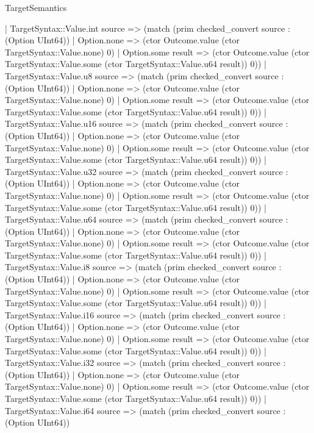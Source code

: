 \begin{lexlean}{TargetSemantics}
\begin{semanticmodule}
{            | TargetSyntax::Value.int source => (match (prim checked_convert source : (Option UInt64))
              | Option.none => (ctor Outcome.value (ctor TargetSyntax::Value.none) 0)
              | Option.some result => (ctor Outcome.value (ctor TargetSyntax::Value.some (ctor TargetSyntax::Value.u64 result)) 0))
            | TargetSyntax::Value.u8 source => (match (prim checked_convert source : (Option UInt64))
              | Option.none => (ctor Outcome.value (ctor TargetSyntax::Value.none) 0)
              | Option.some result => (ctor Outcome.value (ctor TargetSyntax::Value.some (ctor TargetSyntax::Value.u64 result)) 0))
            | TargetSyntax::Value.u16 source => (match (prim checked_convert source : (Option UInt64))
              | Option.none => (ctor Outcome.value (ctor TargetSyntax::Value.none) 0)
              | Option.some result => (ctor Outcome.value (ctor TargetSyntax::Value.some (ctor TargetSyntax::Value.u64 result)) 0))
            | TargetSyntax::Value.u32 source => (match (prim checked_convert source : (Option UInt64))
              | Option.none => (ctor Outcome.value (ctor TargetSyntax::Value.none) 0)
              | Option.some result => (ctor Outcome.value (ctor TargetSyntax::Value.some (ctor TargetSyntax::Value.u64 result)) 0))
            | TargetSyntax::Value.u64 source => (match (prim checked_convert source : (Option UInt64))
              | Option.none => (ctor Outcome.value (ctor TargetSyntax::Value.none) 0)
              | Option.some result => (ctor Outcome.value (ctor TargetSyntax::Value.some (ctor TargetSyntax::Value.u64 result)) 0))
            | TargetSyntax::Value.i8 source => (match (prim checked_convert source : (Option UInt64))
              | Option.none => (ctor Outcome.value (ctor TargetSyntax::Value.none) 0)
              | Option.some result => (ctor Outcome.value (ctor TargetSyntax::Value.some (ctor TargetSyntax::Value.u64 result)) 0))
            | TargetSyntax::Value.i16 source => (match (prim checked_convert source : (Option UInt64))
              | Option.none => (ctor Outcome.value (ctor TargetSyntax::Value.none) 0)
              | Option.some result => (ctor Outcome.value (ctor TargetSyntax::Value.some (ctor TargetSyntax::Value.u64 result)) 0))
            | TargetSyntax::Value.i32 source => (match (prim checked_convert source : (Option UInt64))
              | Option.none => (ctor Outcome.value (ctor TargetSyntax::Value.none) 0)
              | Option.some result => (ctor Outcome.value (ctor TargetSyntax::Value.some (ctor TargetSyntax::Value.u64 result)) 0))
            | TargetSyntax::Value.i64 source => (match (prim checked_convert source : (Option UInt64))
}
\end{semanticmodule}
\end{lexlean}
